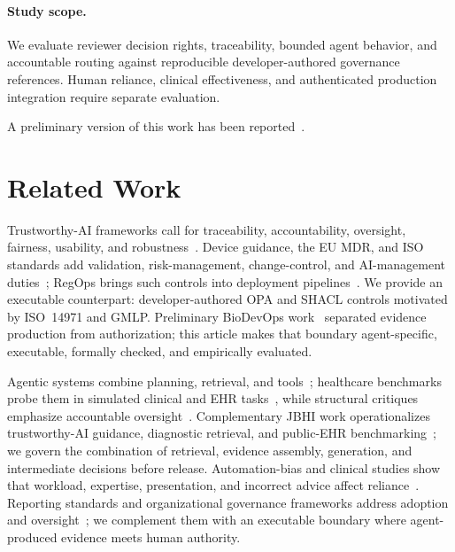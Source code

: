 \documentclass[journal,twoside,web]{ieeecolor}
\begin{document}
\paragraph{Study scope.} We evaluate reviewer decision rights, traceability, bounded agent behavior, and accountable routing against reproducible developer-authored governance references. Human reliance, clinical effectiveness, and authenticated production integration require separate evaluation.

A preliminary version of this work has been reported~\cite{mirto_biodevops_phdforum}.

\section{Related Work}

Trustworthy-AI frameworks call for traceability, accountability, oversight, fairness, usability, and robustness~\cite{future_ai,future_ai_review,nist_ai_rmf,eu_ai_act}. Device guidance, the EU MDR, and ISO standards add validation, risk-management, change-control, and AI-management duties~\cite{fda_aiml_2021,fda_pccp_2025,eu_mdr,iso13485,fda_gmlp,iso14971,iso42001,nist_genai_profile}; RegOps brings such controls into deployment pipelines~\cite{toivakka_regops}. We provide an executable counterpart: developer-authored OPA and SHACL controls motivated by ISO~14971 and GMLP. Preliminary BioDevOps work~\cite{mirto_biodevops_phdforum} separated evidence production from authorization; this article makes that boundary agent-specific, executable, formally checked, and empirically evaluated.

Agentic systems combine planning, retrieval, and tools~\cite{lewis_rag,yao_react}; healthcare benchmarks probe them in simulated clinical and EHR tasks~\cite{agentic_taxonomy_2026,agentclinic,medagentbench}, while structural critiques emphasize accountable oversight~\cite{agentic_limits_2026}. Complementary JBHI work operationalizes trustworthy-AI guidance, diagnostic retrieval, and public-EHR benchmarking~\cite{future_ai_review,garmle_g,public_ehr_benchmark}; we govern the combination of retrieval, evidence assembly, generation, and intermediate decisions before release. Automation-bias and clinical studies show that workload, expertise, presentation, and incorrect advice affect reliance~\cite{goddard_automation_bias,gaube_do_as_ai_say,tschandl_collaboration}. Reporting standards and organizational governance frameworks address adoption and oversight~\cite{decide_ai,economou_zavlanos_jamia,wang_governance_scoping}; we complement them with an executable boundary where agent-produced evidence meets human authority.
\end{document}
